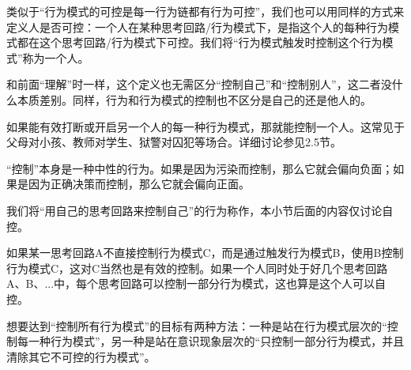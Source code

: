 类似于“行为模式的可控是每一行为链都有行为可控”，我们也可以用同样的方式来定义人是否可控：一个人在某种思考回路/行为模式下，是指这个人的每种行为模式都在这个思考回路/行为模式下可控。我们将“行为模式触发时控制这个行为模式”称为\label{def:控制人}一个人。
\begin{explain}
和前面“理解”时一样，这个定义也无需区分“控制自己”和“控制别人”，这二者没什么本质差别。同样，行为和行为模式的控制也不区分是自己的还是他人的。

如果能有效打断或开启另一个人的每一种行为模式，那就能控制一个人。这常见于父母对小孩、教师对学生、狱警对囚犯等场合。详细讨论参见2.5节。

“控制”本身是一种中性的行为。如果是因为污染而控制，那么它就会偏向负面；如果是因为正确决策而控制，那么它就会偏向正面。
\end{explain}
我们将“用自己的思考回路来控制自己”的行为称作，本小节后面的内容仅讨论自控。
\begin{explain}
如果某一思考回路A不直接控制行为模式C，而是通过触发行为模式B，使用B控制行为模式C，这对C当然也是有效的控制。如果一个人同时处于好几个思考回路A、B、...中，每个思考回路可以控制一部分行为模式，这也算是这个人可以自控。
\end{explain}
想要达到“控制所有行为模式”的目标有两种方法：一种是站在行为模式层次的“控制每一种行为模式”，另一种是站在意识现象层次的“只控制一部分行为模式，并且清除其它不可控的行为模式”。

